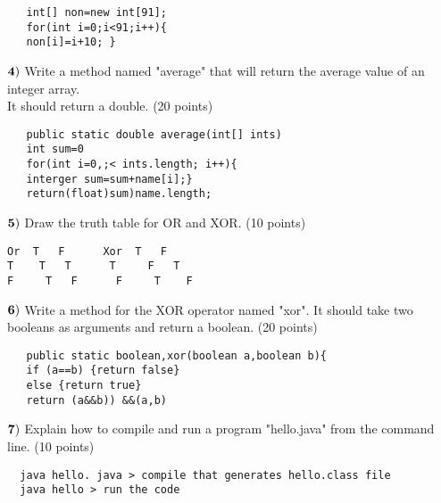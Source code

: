 \documentclass{article}
\begin{document}
   \begin{verbatim}
   int[] non=new int[91];
   for(int i=0;i<91;i++){
   non[i]=i+10; }
   \end{verbatim}
   
  $\bf{4)}$ Write a method named "average" that will return the average value of an integer array. \\
   It should return a double.  (20 points)
   \vspace{0.5cm}


   \begin{verbatim}
   public static double average(int[] ints)
   int sum=0
   for(int i=0,;< ints.length; i++){
   interger sum=sum+name[i];}
   return(float)sum)name.length;
   \end{verbatim}
   
  $\bf{5)}$ Draw the truth table for OR and XOR.  (10 points)
   \vspace{0.5cm}
\begin{verbatim}
Or  T   F      Xor  T   F
T    T   T      T     F   T
F     T   F      F     T    F
\end{verbatim}
   
  $\bf{6)}$ Write a method for the XOR operator named "xor".  It should take two booleans as arguments and return a boolean.  (20 points)
   \vspace{0.5cm}
   \begin{verbatim}
   public static boolean,xor(boolean a,boolean b){
   if (a==b) {return false}
   else {return true}
   return (a&&b)) &&(a,b)
   \end{verbatim}
   $\bf{7)}$ Explain how to compile and run a program "hello.java" from the command line.  (10 points)
  \begin{verbatim}
  java hello. java > compile that generates hello.class file
  java hello > run the code
  \end{verbatim}


  
  
  
    

 
\end{document}
